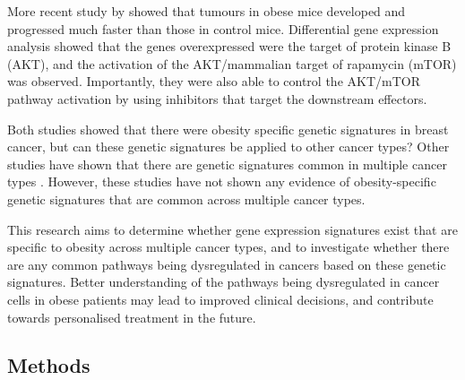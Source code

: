 \documentclass[12pt, a4paper]{article}
\begin{document}
More recent study by \citet{Fuentes-Mattei2014} showed that tumours in obese mice developed and progressed much faster than those in control mice.
Differential gene expression analysis showed that the genes overexpressed were the target of protein kinase B (AKT), and the activation of the AKT/mammalian target of rapamycin (mTOR) was observed.
Importantly, they were also able to control the AKT/mTOR pathway activation by using inhibitors that target the downstream effectors.

Both studies showed that there were obesity specific genetic signatures in breast cancer, but can these genetic signatures be applied to other cancer types?
Other studies have shown that there are genetic signatures common in multiple cancer types \citep{Alexandrov2013,Lawrence2014}.
However, these studies have not shown any evidence of obesity-specific genetic signatures that are common across multiple cancer types.

This research aims to determine whether gene expression signatures exist that are specific to obesity across multiple cancer types, and to investigate whether there are any common pathways being dysregulated in cancers based on these genetic signatures.
Better understanding of the pathways being dysregulated in cancer cells in obese patients may lead to improved clinical decisions, and contribute towards personalised treatment in the future.


\vspace{-11pt}

\subsection*{Methods}
\end{document}
